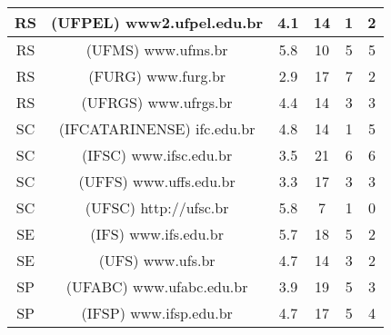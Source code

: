 \begin{center}
\begin{longtable}{|c|l|l|l|l|l|}
\hline
\multicolumn{1}{|c|}{RS} & \multicolumn{1}{c|}{(UFPEL) www2.ufpel.edu.br} & \multicolumn{1}{c|}{4.1} & \multicolumn{1}{c|}{14} & \multicolumn{1}{c|}{1} & \multicolumn{1}{c|}{2} \\ 
\hline
\multicolumn{1}{|c|}{RS} & \multicolumn{1}{c|}{(UFMS) www.ufms.br} & \multicolumn{1}{c|}{5.8} & \multicolumn{1}{c|}{10} & \multicolumn{1}{c|}{5} & \multicolumn{1}{c|}{5} \\ 
\hline
\multicolumn{1}{|c|}{RS} & \multicolumn{1}{c|}{(FURG) www.furg.br} & \multicolumn{1}{c|}{2.9} & \multicolumn{1}{c|}{17} & \multicolumn{1}{c|}{7} & \multicolumn{1}{c|}{2} \\ 
\hline
\multicolumn{1}{|c|}{RS} & \multicolumn{1}{c|}{(UFRGS) www.ufrgs.br} & \multicolumn{1}{c|}{4.4} & \multicolumn{1}{c|}{14} & \multicolumn{1}{c|}{3} & \multicolumn{1}{c|}{3} \\ 
\hline
\multicolumn{1}{|c|}{SC} & \multicolumn{1}{c|}{(IFCATARINENSE) ifc.edu.br} & \multicolumn{1}{c|}{4.8} & \multicolumn{1}{c|}{14} & \multicolumn{1}{c|}{1} & \multicolumn{1}{c|}{5} \\ 
\hline
\multicolumn{1}{|c|}{SC} & \multicolumn{1}{c|}{(IFSC) www.ifsc.edu.br} & \multicolumn{1}{c|}{3.5} & \multicolumn{1}{c|}{21} & \multicolumn{1}{c|}{6} & \multicolumn{1}{c|}{6} \\ 
\hline
\multicolumn{1}{|c|}{SC} & \multicolumn{1}{c|}{(UFFS) www.uffs.edu.br} & \multicolumn{1}{c|}{3.3} & \multicolumn{1}{c|}{17} & \multicolumn{1}{c|}{3} & \multicolumn{1}{c|}{3} \\ 
\hline
\multicolumn{1}{|c|}{SC} & \multicolumn{1}{c|}{(UFSC) http://ufsc.br} & \multicolumn{1}{c|}{5.8} & \multicolumn{1}{c|}{7} & \multicolumn{1}{c|}{1} & \multicolumn{1}{c|}{0} \\ 
\hline
\multicolumn{1}{|c|}{SE} & \multicolumn{1}{c|}{(IFS) www.ifs.edu.br} & \multicolumn{1}{c|}{5.7} & \multicolumn{1}{c|}{18} & \multicolumn{1}{c|}{5} & \multicolumn{1}{c|}{2} \\ 
\hline
\multicolumn{1}{|c|}{SE} & \multicolumn{1}{c|}{(UFS) www.ufs.br} & \multicolumn{1}{c|}{4.7} & \multicolumn{1}{c|}{14} & \multicolumn{1}{c|}{3} & \multicolumn{1}{c|}{2} \\ 
\hline
\multicolumn{1}{|c|}{SP} & \multicolumn{1}{c|}{(UFABC) www.ufabc.edu.br} & \multicolumn{1}{c|}{3.9} & \multicolumn{1}{c|}{19} & \multicolumn{1}{c|}{5} & \multicolumn{1}{c|}{3} \\ 
\hline
\multicolumn{1}{|c|}{SP} & \multicolumn{1}{c|}{(IFSP) www.ifsp.edu.br} & \multicolumn{1}{c|}{4.7} & \multicolumn{1}{c|}{17} & \multicolumn{1}{c|}{5} & \multicolumn{1}{c|}{4} \\ 

\end{longtable}
\end{center}
